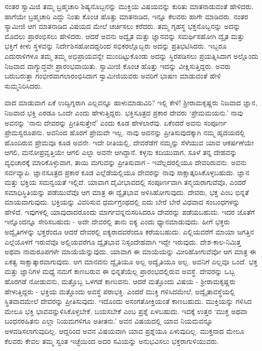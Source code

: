 ನಂತರ ಸ್ವಾಮಿಜಿ ತಮ್ಮ ಬ್ರಹ್ಮಚಾರಿ ಶಿಷ್ಯನೊಬ್ಬನನ್ನು ಮುಕ್ತಿಯ ವಿಷಯವನ್ನು ಕುರಿತು ಮಾತನಾಡುವಂತೆ ಹೇಳಿದರು. ಹಾಗೆಯೇ ಬ್ರಹ್ಮಚಾರಿ ಎದ್ದು ನಿಂತು ಕೊಂಚ ಹೊತ್ತು ಮಾತನಾಡಿದ, ಇನ್ನೂ ಕೆಲವರು ಹಾಗೇ ಮಾಡಿದರು. ನಂತರ ಸ್ಯಾಮೀಜಿ ಆಗ ಮಾತನಾಡಿದ ವಿಷಯದ ಮೇಲೆ ಚರ್ಚಿಸಲು ಕರೆದರು. ತಮ್ಮ ಗೃಹಸ್ಥ ಭಕ್ತನೊಬ್ಬನನ್ನು ಅದನ್ನು ಮೊದಲು ಪ್ರಾರಂಭಿಸಲು ಹೇಳಿದರು. ಆದರೆ ಅವನು ಅದ್ವೈತ ಮತ್ತು ಜ್ಞಾನವನ್ನು ಸಮರ್ಥಿಸಹೋಗಿ ದ್ವೈತ ಮತ್ತು ಭಕ್ತಿಗೆ ಕೀಳು ಸ್ಥಳವನ್ನು ನಿರ್ದೇಶಿಸಹೋದದ್ದರಿಂದ ಸಭಿಕರಲ್ಲೊಬ್ಬರು ಅದನ್ನು ಪ್ರತಿಭಟಿಸಿದರು. ಇಬ್ಬರೂ ಎದುರಾಳಿಗಳೂ ತಮ್ಮ ತಮ್ಮ ಅಭಿಪ್ರಾಯವನ್ನೇ ಮುಂದಿಟ್ಟುಕೊಂಡು ಅದನ್ನು ಸ್ಥಿರಪಡಿಸಲು ಪ್ರಯತ್ನಿಸಿದಾಗ ಅಲ್ಲೊಂದು ನಿಜವಾದ ವಾಗ್ಯುದ್ಧವೇ ಪ್ರಾರಂಭವಾಯಿತು. ಸ್ವಾಮೀಜಿ ಕೊಂಚ ಹೊತ್ತು ಇದನ್ನು ವೀಕ್ಷಿಸುತ್ತಿದ್ದರು. ಅವರು ಬರುಬರುತ್ತಾ ಗಂಭೀರವಾಗಲಾರಂಭಿಸಿದಾಗ ಸ್ವಾಮೀಜಿಯವರು ಅವರಿಗೆ ಭಾಷಣ ಮಾಡುವಂತೆ ಹೇಳಿ ಸುಮ್ಮನಿರಿಸಿದರು.

ವಾದ ಮಾಡುವಾಗ ಏಕೆ ಉದ್ವಿಗ್ನರಾಗಿ ಎಲ್ಲವನ್ನೂ ಹಾಳುಮಾಡುವಿರಿ? ಇಲ್ಲಿ ಕೇಳಿ! ಶ‍್ರೀರಾಮಕೃಷ್ಣರು ನಿಜವಾದ ಜ್ಞಾನ, ನಿಜವಾದ ಭಕ್ತಿ ಎರಡೂ ಒಂದೇ ಎಂದು ಹೇಳುತ್ತಿದ್ದರು. ಭಕ್ತಿಸೂತ್ರದ ಪ್ರಕಾರ ದೇವರು ‘ಪ್ರೇಮಮಯನು.’ ನಾವು ಅವನನ್ನು ‘ನಾನು ದೇವರನ್ನು ಪ್ರೀತಿಸುತ್ತೇನೆ’ ಎಂದು ಕೂಡ ಹೇಳಲಾರೆವು. ಏಕೆಂದರೆ ಅವನು ಸಂಪೂರ್ಣ ಪ್ರೇಮಸ್ವರೂಪನು. ಅವನಿಂದ ಹೊರಗೆ ಪ್ರೇಮವೇ ಇಲ್ಲ. ನಾವು ಅವನನ್ನು ಪ್ರೀತಿಸುವುದಕ್ಕಾಗಿ ನಮ್ಮ ಹೃದಯದಲ್ಲಿ ಹೊಂದಿರುವ ಪ್ರೇಮವೂ ಕೂಡ ಅವನೇ. ಇದೇ ರೀತಿಯಲ್ಲಿ, ದೇವರೆಡೆಗೆ ನಮ್ಮನ್ನು ಸೆಳೆಯುವ ಯಾವ ಆಕರ್ಷಣೆಯೇ ಆಗಲಿ, ಮನೋಪ್ರವೃತ್ತಿಯೇ ಆಗಲಿ ಎಲ್ಲಾ ಅವನೇ ಆಗಿದ್ದಾನೆ. ಕಳ್ಳನು ಕದಿಯುವಾಗ, ಸೂಳೆ ತನ್ನ ದೇಹವನ್ನು ವ್ಯಭಿಚಾರಕ್ಕೆ ಮಾರಿಕೊಳ್ಳುವಾಗ, ತಾಯಿ ಮಗುವನ್ನು ಪ್ರೀತಿಸುವಾಗ - ಇವೆಲ್ಲದರಲ್ಲಿಯೂ ದೇವರಿರುವನು. ಅವನು ಸರ್ವವ್ಯಾಪಿ. ಜ್ಞಾನಸೂತ್ರದ ಪ್ರಕಾರ ಕೂಡ ಎಲ್ಲೆಡೆಯಲ್ಲಿಯೂ ದೇವರನ್ನು ನಾವು ಸಾಕ್ಷಾತ್ಕರಿಸಿಕೊಳ್ಳಬಹುದು. ಜ್ಞಾನ ಮತ್ತು ಭಕ್ತಿಯ ಸಮನ್ವಯತೆ ಇಲ್ಲಿದೆ. ಯಾವಾಗ ದೈವೀಭಾವದಲ್ಲಿ ಸಂಪೂರ್ಣವಾಗಿ ತನ್ಮಯರಾಗುವೆವೊ, ಎಂದರೆ ಸಮಾಧಿಸ್ಥಿತಿಯನ್ನು ಪಡೆಯುವೆವೊ ಆಗ ಮಾತ್ರ ಈ ದ್ವೈತಭಾವ ಅಳಿಸಿಹೋಗುವುದು. ದೇವರು, ಭಕ್ತ ಎಂಬ ಭಿನ್ನತೆ ಮಾಯವಾಗುವುದು. ಭಕ್ತಿಯನ್ನು ವಿವರಿಸುವ ಧರ್ಮಗ್ರಂಥದಲ್ಲಿ ಐದು ಬೇರೆ ಬೇರೆ ವಿಧವಾದ ಸಂಬಂಧಗಳನ್ನು ಹೇಳಿದೆ. ಇವುಗಳಲ್ಲಿ ಯಾವುದಾದರೊಂದು ಮಾರ್ಗವನ್ನನುಸರಿಸಿದರೂ ದೇವರನ್ನು ಪಡೆಯಬಹುದು. ಇದರ ಜೊತೆಗೆ ಇನ್ನೊಂದನ್ನೂ ಸೇರಿಸಬಹುದು - ಅದೇ ದೇವರಲ್ಲಿ ತಾನು ಐಕ್ಯ ಎಂದು ಧ್ಯಾನಮಾಡುವುದು. ಹೀಗೆ ಭಕ್ತರು ಅದ್ವೈತಿಗಳನ್ನು ಭಕ್ತರೆಂದೂ ಆದರೆ ದೇವರಲ್ಲಿ ಐಕ್ಯರಾದವರೆಂದೂ ಕರೆಯಬಹುದು. ಎಲ್ಲಿಯವರೆಗೆ ಮಾಯಾ ಜಗತ್ತಿನ ಎಲ್ಲೆಯೊಳಗೆ ಇರುವೆವೊ ಅಲ್ಲಿಯವರೆಗೂ ದ್ವೈತಭಾವ ನಿಸ್ಸಂದೇಹವಾಗಿ ಇದ್ದೇ ಇರುವುದು. ದೇಶ-ಕಾಲ-ನಿಮಿತ್ತ ಅಥವಾ ನಾಮರೂಪಗಳೇ ಮಾಯೆಯೆನ್ನುವುದು. ಯಾವಾಗ ಈ ಮಾಯೆಯನ್ನು ಮೀರಿಹೋಗುವೆವೋ ಆಗ ಮಾತ್ರ ಈ ಏಕತ್ವ ಸಾಕ್ಷಾತ್ಕಾರವಾಗುವುದು. ಆಗ ಮಾನವನು ದ್ವೈತಿಯೂ ಅಲ್ಲ ಅದ್ವೈತಿಯೂ ಅಲ್ಲ. ಅವನಿಗೆ ಎಲ್ಲವೂ ಒಂದೆ. ಭಕ್ತ ಮತ್ತು ಜ್ಞಾನಿಗಳ ಮಧ್ಯೆ ನಮಗೆ ಕಾಣಬರುವ ಈ ಭಿನ್ನತೆಯೆಲ್ಲ ಪ್ರಾರಂಭದಲ್ಲಿರುವ ಅವಸ್ಥೆ. ದೇವರನ್ನು ಒಬ್ಬ ಹೊರಗಡೆ ನೋಡುವನು, ಮತ್ತೊಬ್ಬ ಒಳಗಡೆ ಕಾಣುವನು. ಆದರೆ ಮತ್ತೊಂದು ವಿಷಯ - ಶ‍್ರೀರಾಮಕೃಷ್ಣರು ಹೇಳುತ್ತಿದ್ದರು - ಭಕ್ತಿಯ ಮತ್ತೊಂದು ಅವಸ್ಥೆ ಪರಾಭಕ್ತಿ. ಎಂದರೆ ಮುಕ್ತಿ ಗಳಿಸಿದಮೇಲೆ, ಅದ್ವೈತಾವಸ್ಥೆಯಲ್ಲಿ ಸ್ಥಿತವಾದಮೇಲೆ ದೇವರನ್ನು ಪ್ರೀತಿಸುವುದು. ಇದೊಂದು ಅಸಂಗತೋಕ್ತಿಯಂತೆ ಕಾಣಬಹುದು. ಮುಕ್ತಿಯನ್ನು ಗಳಿಸಿದ ಮೇಲೂ ಭಕ್ತಿ ಭಾವವನ್ನುಳಿಸಿಕೊಳ್ಳಬೇಕೆ, ಬಯಸಬೇಕೆ ಎಂಬ ಪ್ರಶ್ನೆ ಏಳಬಹುದು. ಇದಕ್ಕೆ ಉತ್ತರ ‘ಮುಕ್ತ ಅಥವಾ ಬಂಧನರಹಿತನು ಎಲ್ಲಾ ನಿಯಮಗಳಿಗೂ ಅತೀತನು.’ ಅವನ ವಿಷಯದಲ್ಲಿ ಯಾವ ನಿಯಮವನ್ನೂ ಅಳವಡಿಸಲಾಗುವುದಿಲ್ಲ. ಆದ್ದರಿಂದ ಅವನ ವಿಷಯವಾಗಿ ಯಾವ ಪ್ರಶ್ನೆಯೂ ಏಳುವುದಿಲ್ಲ. ಮುಕ್ತನಾದ ಮೇಲೂ ಕೆಲವರು ಕೇವಲ ತಮ್ಮ ಸ್ವಂತ ಇಚ್ಛೆಯಿಂದ ಅದರ ಸವಿಯನ್ನು ಅನುಭವಿಸಲು ಭಕ್ತರಾಗುಳಿಯುವರು.


